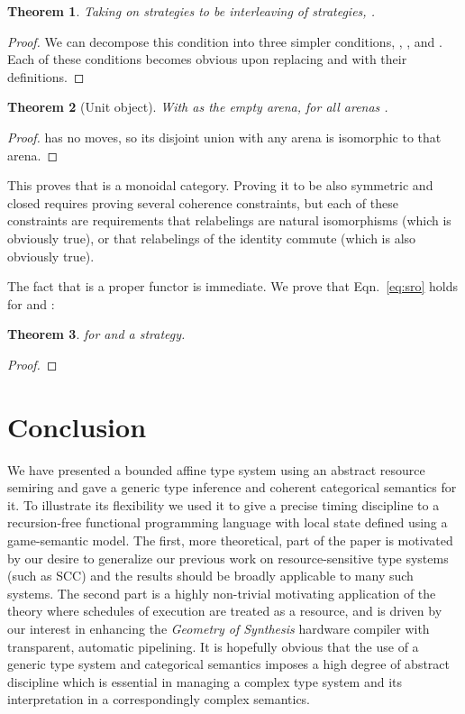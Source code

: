 \documentclass{article}
\newtheorem{theorem}{Theorem}
\begin{document}
\begin{theorem}
  Taking  on strategies to be interleaving of strategies, .
\end{theorem}
\begin{proof}
  We can decompose this condition into three simpler conditions, , , and . Each of these conditions becomes obvious upon replacing  and  with their definitions.
\end{proof}
\begin{theorem}[Unit object]
  With  as the empty arena,  for all arenas .
\end{theorem}
\begin{proof}
   has no moves, so its disjoint union with any arena is isomorphic to that arena.
\end{proof}
This proves that  is a monoidal category. Proving it to be also symmetric and closed requires proving several coherence constraints, but each of these constraints are requirements that relabelings are natural isomorphisms (which is obviously true), or that relabelings of the identity commute (which is also obviously true).

\allowdisplaybreaks 
The fact that  is a proper functor is immediate. We  prove that Eqn.~\ref{eq:sro} holds for  and :
\begin{theorem}
   for  and  a strategy.
\end{theorem}
\begin{proof}
  
\end{proof}

\section{Conclusion}

We have presented a bounded affine type system using an abstract resource semiring and gave a generic type inference and coherent categorical semantics for it. To illustrate its flexibility we used it to give a precise timing discipline to a recursion-free functional programming language with local state defined using a game-semantic model. The first, more theoretical, part of the paper is motivated by our desire to generalize our previous work on resource-sensitive type systems (such as SCC) and the results should be broadly applicable to many such systems. The second part is a highly non-trivial motivating application of the theory where schedules of execution are treated as a resource, and is driven by our interest in enhancing the \emph{Geometry of Synthesis} hardware compiler with transparent, automatic pipelining. It is hopefully obvious that the use of a generic type system and categorical semantics imposes a high degree of abstract discipline which is essential in managing a complex type system and its interpretation in a correspondingly complex semantics.
\end{document}

